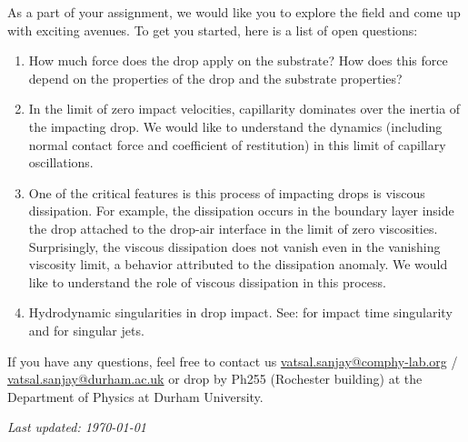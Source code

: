 \documentclass[11pt]{article}
\begin{document}
As a part of your assignment, we would like you to explore the field and come up with exciting avenues. To get you started, here is a list of open questions:

\begin{enumerate}
 \item How much force does the drop apply on the substrate? How does this force depend on the properties of the drop and the substrate properties?
 \item In the limit of zero impact velocities, capillarity dominates over the inertia of the impacting drop. We would like to understand the dynamics (including normal contact force and coefficient of restitution) in this limit of capillary oscillations. 
 \item One of the critical features is this process of impacting drops is viscous dissipation. For example, the dissipation occurs in the boundary layer inside the drop attached to the drop-air interface in the limit of zero viscosities. Surprisingly, the viscous dissipation does not vanish even in the vanishing viscosity limit, a behavior attributed to the dissipation anomaly. We would like to understand the role of viscous dissipation in this process. 
 \item Hydrodynamic singularities in drop impact. See: \citet{mandre2012mechanism} for impact time singularity and \citet{Bartolo2006Singular, sanjay_lohse_jalaal_2021, zhang2022impact} for singular jets. 
\end{enumerate} 

If you have any questions, feel free to contact us \href{mailto:vatsal.sanjay@comphy-lab.org}{vatsal.sanjay@comphy-lab.org} /\\ \href{mailto:vatsal.sanjay@durham.ac.uk}{vatsal.sanjay@durham.ac.uk} or drop by Ph255 (Rochester building) at the Department of Physics at Durham University.

\vspace{1em}
\noindent\textit{Last updated: \today}

\printbibliography
\end{document}
